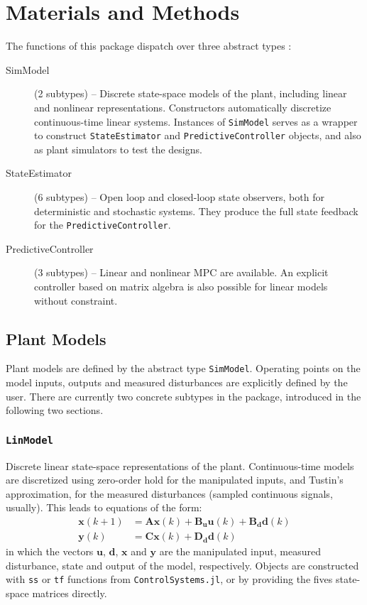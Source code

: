 
\section{Materials and Methods}

The functions of this package dispatch over three abstract types :
\begin{description}
    \item[SimModel] (2 subtypes) -- Discrete state-space models of the plant, including linear and nonlinear representations. Constructors automatically discretize 
    continuous-time linear systems. Instances of \texttt{SimModel} serves as a wrapper to construct \texttt{StateEstimator} and \texttt{PredictiveController} objects, and also as plant simulators to test the designs.
    \item[StateEstimator] (6 subtypes) -- Open loop and closed-loop state observers, both for deterministic and stochastic systems. They produce the full state feedback for the \texttt{PredictiveController}.
    \item[PredictiveController] (3 subtypes) -- Linear and nonlinear MPC are available. An explicit controller based on matrix algebra is also possible for linear models without constraint.
\end{description}

\subsection{Plant Models}

Plant models are defined by the abstract type \texttt{SimModel}. Operating points on the model inputs, outputs and measured disturbances are explicitly defined by the user. There are currently two concrete subtypes in the package, introduced in the following two sections.

\subsubsection{\textnormal{\texttt{LinModel}}}

Discrete linear state-space representations of the plant. Continuous-time models are discretized using zero-order hold for the manipulated inputs, and Tustin's approximation, for the measured disturbances (sampled continuous signals, usually). This leads to equations of the form:
\begin{subequations}
\begin{align}
    \mathbf{x}(k+1) &= \mathbf{A x}(k) + \mathbf{B_u u}(k) + \mathbf{B_d d}(k) \\
    \mathbf{y}(k)   &= \mathbf{C x}(k) + \mathbf{D_d d}(k)
\end{align}
\end{subequations}
in which the vectors $\mathbf{u}$, $\mathbf{d}$, $\mathbf{x}$ and $\mathbf{y}$ are the manipulated input, measured disturbance, state and output of the model, respectively. Objects are constructed with \texttt{ss} or \texttt{tf} functions from \texttt{ControlSystems.jl}, or by providing the fives state-space matrices directly.

